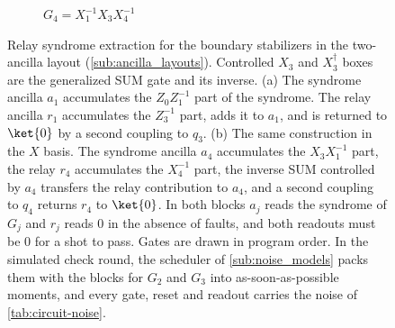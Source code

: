 \begin{figure}[H]
\begin{subfigure}[b]{0.54\textwidth}
        \caption{$G_4 = X_1^{-1} X_3 X_4^{-1}$}
        \label{fig:two_ancilla_g4}
    \end{subfigure}
    \caption{Relay syndrome extraction for the boundary stabilizers in the two-ancilla layout (\autoref{sub:ancilla_layouts}). Controlled $X_3$ and $X_3^{\dagger}$ boxes are the generalized SUM gate and its inverse. (a) The syndrome ancilla $a_1$ accumulates the $Z_0 Z_1^{-1}$ part of the syndrome. The relay ancilla $r_1$ accumulates the $Z_3^{-1}$ part, adds it to $a_1$, and is returned to $\ket{0}$ by a second coupling to $q_3$. (b) The same construction in the $X$ basis. The syndrome ancilla $a_4$ accumulates the $X_3 X_1^{-1}$ part, the relay $r_4$ accumulates the $X_4^{-1}$ part, the inverse SUM controlled by $a_4$ transfers the relay contribution to $a_4$, and a second coupling to $q_4$ returns $r_4$ to $\ket{0}$. In both blocks $a_j$ reads the syndrome of $G_j$ and $r_j$ reads $0$ in the absence of faults, and both readouts must be $0$ for a shot to pass. Gates are drawn in program order. In the simulated check round, the scheduler of \autoref{sub:noise_models} packs them with the blocks for $G_2$ and $G_3$ into as-soon-as-possible moments, and every gate, reset and readout carries the noise of \autoref{tab:circuit-noise}.}
    \label{fig:two_ancilla_checks}
\end{figure}
